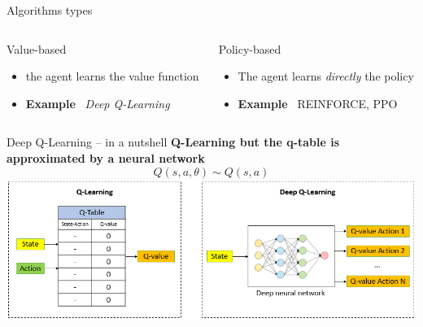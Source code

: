 \documentclass[presentation, 9pt]{beamer}\mode<presentation>{\usetheme{AMSBolognaFC}}
\begin{document}
\begin{frame}{Algorithms types}	
\begin{columns}
	\begin{column}{0.45\textwidth}
		\begin{block}{Value-based}
			\begin{itemize}
				\item the agent learns the value function
				\item \textbf{Example} \faArrowRight \, \emph{Deep Q-Learning}
			\end{itemize}
		\end{block}
		\href{https://www.youtube.com/watch?v=V1eYniJ0Rnk}{}
	\end{column}

	\begin{column}{0.45\textwidth}
		\begin{block}{Policy-based}
			\begin{itemize}
				\item The agent learns \emph{directly} the policy 
				\item \textbf{Example} \faArrowRight \, REINFORCE, PPO
			\end{itemize}
		\end{block}
		\centering
		\href{https://openai.com/research/openai-baselines-ppo}{}
	\end{column}
\end{columns}

\end{frame}
\begin{frame}{Deep Q-Learning -- in a nutshell}
	\centering
	\large{
	\textbf{Q-Learning but the q-table is approximated by a neural network}
	}
	$$ Q(s, a, \theta) \sim Q(s, a) $$
	\includegraphics[width=\textwidth]{img/dql-vs-ql-1.png}
\end{frame}
\end{document}
